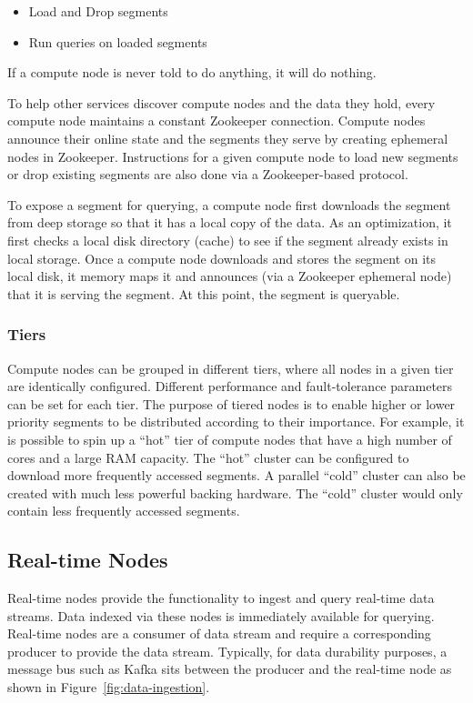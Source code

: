 \documentclass{vldb}
\begin{document}
\begin{itemize}
\item Load and Drop segments
\item Run queries on loaded segments
\end{itemize}

If a compute node is never told to do anything, it will do nothing.

To help other services discover compute nodes and the data they hold, every compute node maintains a constant Zookeeper connection. Compute nodes announce their online state and the segments they serve by creating ephemeral nodes in Zookeeper. Instructions for a given compute node to load new segments or drop existing segments are also done via a Zookeeper-based protocol.

To expose a segment for querying, a compute node first downloads the segment from deep storage so that it has a local copy of the data.  As an optimization, it first checks a local disk directory (cache) to see if the segment already exists in local storage. Once a compute node downloads and stores the segment on its local disk, it memory maps it and announces (via a Zookeeper ephemeral node) that it is serving the segment. At this point, the segment is queryable.

\subsubsection{Tiers}
\label{sec:tiers}
Compute nodes can be grouped in different tiers, where all nodes in a given tier are identically configured. Different performance and fault-tolerance parameters can be set for each tier. The purpose of tiered nodes is to enable higher or lower priority segments to be distributed according to their importance. For example, it is possible to spin up a ``hot'' tier of compute nodes that have a high number of cores and a large RAM capacity. The ``hot'' cluster can be configured to download more frequently accessed segments. A parallel ``cold'' cluster can also be created with much less powerful backing hardware. The ``cold'' cluster would only contain less frequently accessed segments.

\subsection{Real-time Nodes}
\label{sec:realtime}
Real-time nodes provide the functionality to ingest and query real-time data streams. Data indexed via these nodes is immediately available for querying. Real-time nodes are a consumer of data stream and require a corresponding producer to provide the data stream. Typically, for data durability purposes, a message bus such as Kafka \cite{kreps2011kafka} sits between the producer and the real-time node as shown in Figure~\ref{fig:data-ingestion}.
\end{document}

